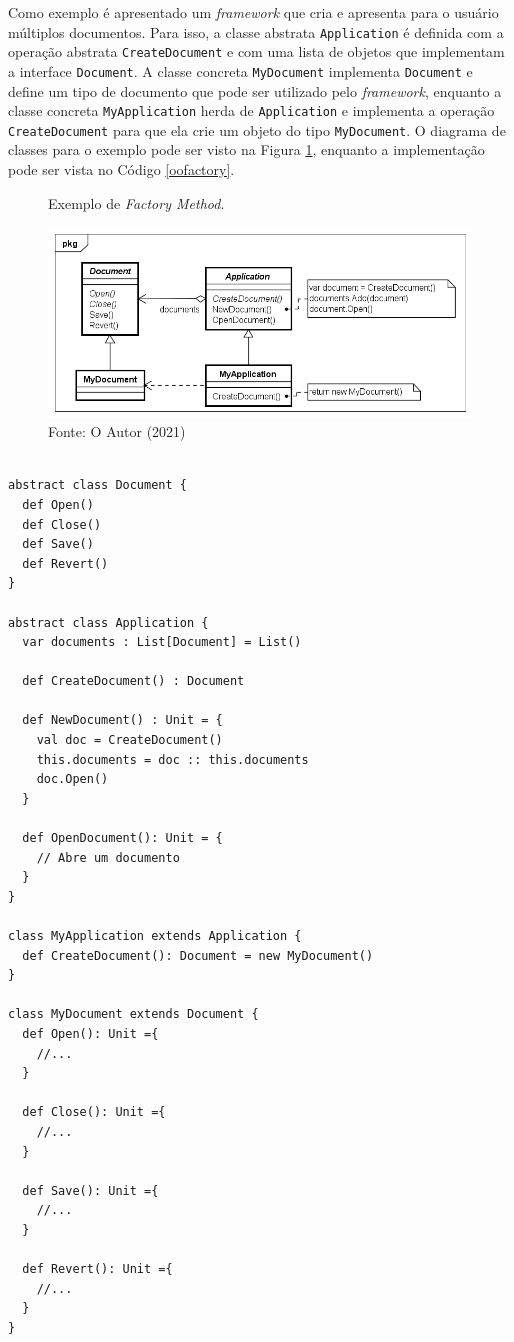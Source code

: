 Como exemplo é apresentado um \textit{framework} 
que cria e apresenta para o usuário múltiplos 
documentos. Para isso, a classe abstrata 
\texttt{Application} é definida com a operação abstrata 
\texttt{CreateDocument} e com uma lista de objetos 
que implementam a interface \texttt{Document}. A classe 
concreta \texttt{MyDocument} implementa \texttt{Document} e define 
um tipo de documento que pode ser utilizado pelo 
\textit{framework}, enquanto a classe concreta 
\texttt{MyApplication} herda de \texttt{Application} e implementa 
a operação \texttt{CreateDocument} para que ela crie 
um objeto do tipo \texttt{MyDocument}. O diagrama de classes 
para o exemplo pode ser visto na Figura \ref{fmethod_example}, 
enquanto a implementação pode ser vista no 
Código \ref{oofactory}.


\begin{figure}[htb]
	\caption{\label{fmethod_example}Exemplo de \textit{Factory Method}.}
	\begin{center}
	    \includegraphics[scale=0.5]{5_padroes-contexto-funcional/5.1_criacionais/5.1.1_factory-method/factorymethod_exemplo.png}
	\end{center}
  \caption*{Fonte: O Autor (2021)}
\end{figure}

\begin{lstlisting}[caption={\textit{Factory Method} Orientado a Objetos.},label=oofactory]
    
abstract class Document {
  def Open()
  def Close()
  def Save()
  def Revert()
}

abstract class Application {
  var documents : List[Document] = List()

  def CreateDocument() : Document

  def NewDocument() : Unit = {
    val doc = CreateDocument()
    this.documents = doc :: this.documents
    doc.Open()
  }

  def OpenDocument(): Unit = {
    // Abre um documento
  }
}

class MyApplication extends Application {
  def CreateDocument(): Document = new MyDocument()
}

class MyDocument extends Document {
  def Open(): Unit ={
    //...
  }

  def Close(): Unit ={
    //...
  }

  def Save(): Unit ={
    //...
  }

  def Revert(): Unit ={
    //...
  }
}

\end{lstlisting}


